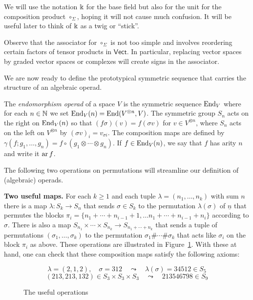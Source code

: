 We will use the notation $\Bbbk$ for the base field but
also for the unit for the composition product $\circ_\Sigma$,
hoping it will not cause much confusion. It will be useful 
later to think of $\Bbbk$ as a twig or ``stick''.

Observe that the associator for $\circ_\Sigma$ is
not too simple and involves reordering certain
factors of tensor products in $\mathsf{Vect}$. In
particular, replacing vector spaces by graded vector
spaces or complexes will create signs in the
associator.

We are now ready to define the prototypical symmetric
 sequence that carries the structure of an algebraic 
 operad. 
 
\begin{definition}
The \emph{endomorphism operad} of a space $V$ is the symmetric sequence $\operatorname{End}_V$
where for each $n\in\mathbb N$ we set $\operatorname{End}_V(n) = \operatorname{End}(V^{\otimes n}, V)$. 
The symmetric group $S_n$ acts on the right
on $\operatorname{End}_V(n)$ 
so that $(f\sigma)(v) = f(\sigma v)$ for
$v\in V^{\otimes n}$, where $S_n$ acts on
the left on $V^{\otimes n}$ by $(\sigma v)_i
= v_{\sigma i}$. The composition maps are defined
by $\gamma(f;g_1,\ldots,g_n) = f\circ (g_1\otimes\cdots \otimes g_n)$. 
If $f\in\operatorname{End}_V(n)$, we say that $f$ has arity $n$ and write
it $\operatorname{ar}{f}$.
\end{definition}


The following two operations on permutations 
will streamline our definition of (algebraic)
operads.

\medskip

\textbf{Two useful maps.} For each $k\geqslant 1$
and each tuple $\lambda = (n_1,\ldots,n_k)$ 
with sum $n$ there is a map $\lambda : S_k
 \longrightarrow S_n $
that sends $\sigma\in S_k$ to the permutation
$\lambda(\sigma)$ of $\underline{n}$ that permutes the blocks 
$\pi_i = \{n_1+\cdots+n_{i-1}+1,\ldots
			n_1+\cdots+n_{i-1}+n_i\}$
			according to $\sigma$.
There is also a map
$S_{n_1}\times \cdots \times  S_{n_k} 
	\longrightarrow S_{n_1+\cdots+n_k}$
	that sends a tuple of permutations 
	$(\sigma_1,\ldots,\sigma_k)$ to the
	permutation $\sigma_1\#\cdots \# \sigma_k$
	that acts like $\sigma_i$ on the block $\pi_i$
	as above. These operations are illustrated
	in Figure~\ref{fig:1}. With these at hand, 
one can check that these composition maps
satisfy the following axioms:

\begin{figure}
$$\lambda = (2,1,2), \quad \sigma = 312
	\quad \leadsto \quad \lambda(\sigma) =  34512 \in S_5
	$$
	$$
	(213,213,132)\in S_3\times S_3\times S_3 \quad \leadsto \quad 213546798\in S_9 $$
\caption{The useful operations}
\label{fig:1}
\end{figure}

